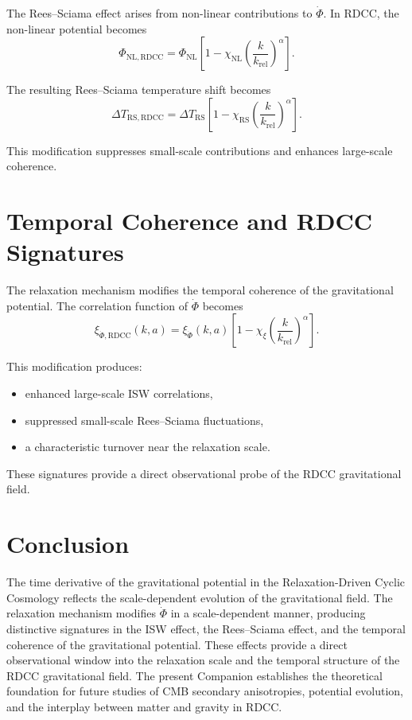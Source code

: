 \documentclass[11pt,a4paper]{article}
\begin{document}
The Rees--Sciama effect arises from non-linear contributions to $\dot{\Phi}$. In 
RDCC, the non-linear potential becomes
\begin{equation}
    \Phi_{\mathrm{NL,RDCC}}
    = \Phi_{\mathrm{NL}}
      \left[
        1 - \chi_{\mathrm{NL}}
        \left(\frac{k}{k_{\mathrm{rel}}}\right)^{\alpha}
      \right].
\end{equation}

The resulting Rees--Sciama temperature shift becomes
\begin{equation}
    \Delta T_{\mathrm{RS,RDCC}}
    = \Delta T_{\mathrm{RS}}
      \left[
        1 - \chi_{\mathrm{RS}}
        \left(\frac{k}{k_{\mathrm{rel}}}\right)^{\alpha}
      \right].
\end{equation}

This modification suppresses small-scale contributions and enhances large-scale 
coherence.
\section{Temporal Coherence and RDCC Signatures}

The relaxation mechanism modifies the temporal coherence of the gravitational 
potential. The correlation function of $\dot{\Phi}$ becomes
\begin{equation}
    \xi_{\dot{\Phi},\mathrm{RDCC}}(k,a)
    = \xi_{\dot{\Phi}}(k,a)
      \left[
        1 - \chi_{\xi}
        \left(\frac{k}{k_{\mathrm{rel}}}\right)^{\alpha}
      \right].
\end{equation}

This modification produces:

\begin{itemize}
    \item enhanced large-scale ISW correlations,
    \item suppressed small-scale Rees--Sciama fluctuations,
    \item a characteristic turnover near the relaxation scale.
\end{itemize}

These signatures provide a direct observational probe of the RDCC gravitational 
field.
\section{Conclusion}

The time derivative of the gravitational potential in the Relaxation-Driven Cyclic 
Cosmology reflects the scale-dependent evolution of the gravitational field. The 
relaxation mechanism modifies $\dot{\Phi}$ in a scale-dependent manner, producing 
distinctive signatures in the ISW effect, the Rees--Sciama effect, and the temporal 
coherence of the gravitational potential. These effects provide a direct 
observational window into the relaxation scale and the temporal structure of the 
RDCC gravitational field. The present Companion establishes the theoretical 
foundation for future studies of CMB secondary anisotropies, potential evolution, 
and the interplay between matter and gravity in RDCC.


\nocite{*}

\end{document}

